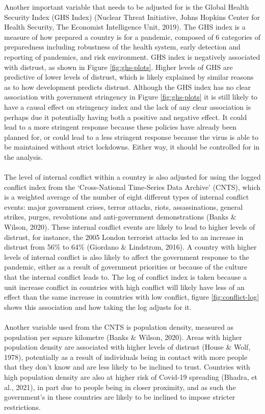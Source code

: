 \documentclass[
  12pt,
]{article}
\begin{document}
Another important variable that needs to be adjusted for is the Global Health Security Index (GHS Index) (Nuclear Threat Initiative, Johns Hopkins Center for Health Security, The Economist Intelligence Unit, 2019). The GHS index is a measure of how prepared a country is for a pandemic, composed of 6 categories of preparedness including robustness of the health system, early detection and reporting of pandemics, and risk environment. GHS index is negatively associated with distrust, as shown in Figure \ref{fig:ghs-plots}. Higher levels of GHS are predictive of lower levels of distrust, which is likely explained by similar reasons as to how development predicts distrust. Although the GHS index has no clear association with government stringency in Figure \ref{fig:ghs-plots} it is still likely to have a causal effect on stringency index and the lack of any clear association is perhaps due it potentially having both a positive and negative effect. It could lead to a more stringent response because these policies have already been planned for, or could lead to a less stringent response because the virus is able to be maintained without strict lockdowns. Either way, it should be controlled for in the analysis.\\
~\\
The level of internal conflict within a country is also adjusted for using the logged conflict index from the `Cross-National Time-Series Data Archive' (CNTS), which is a weighted average of the number of eight different types of internal conflict events: major government crises, terror attacks, riots, assassinations, general strikes, purges, revolutions and anti-government demonstrations (Banks \& Wilson, 2020). These internal conflict events are likely to lead to higher levels of distrust, for instance, the 2005 London terrorist attacks led to an increase in distrust from 56\% to 64\% (Giordano \& Lindstrom, 2016). A country with higher levels of internal conflict is also likely to affect the government response to the pandemic, either as a result of government priorities or because of the culture that the internal conflict leads to. The log of conflict index is taken because a unit increase conflict in countries with high conflict will likely have less of an effect than the same increase in countries with low conflict, figure \ref{fig:conflict-log} shows this association and how taking the log adjusts for it.\\
~\\
Another variable used from the CNTS is population density, measured as population per square kilometre (Banks \& Wilson, 2020). Areas with higher population density are associated with higher levels of distrust (House \& Wolf, 1978), potentially as a result of individuals being in contact with more people that they don't know and are less likely to be inclined to trust. Countries with high population density are also at higher risk of Covid-19 spreading (Bhadra, et al., 2021), in part due to people being in closer proximity, and as such the government's in these countries are likely to be inclined to impose stricter restrictions.\\
\end{document}

